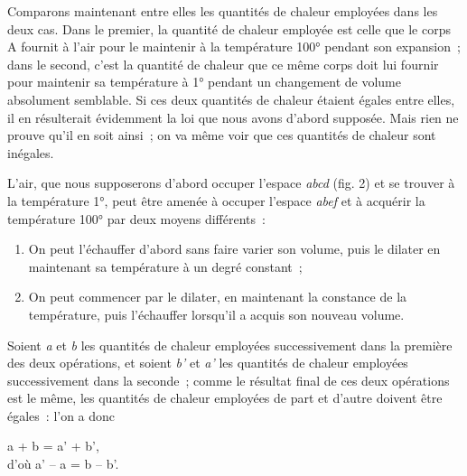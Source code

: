 \documentclass[french,twoside]{book} %
\begin{document}
Comparons maintenant entre elles les quantités de chaleur employées dans les deux cas. Dans le premier, la quantité de chaleur employée est celle que le corps A fournit à l’air pour le maintenir à la température 100° pendant son expansion ; dans le second, c’est la quantité de chaleur que ce même corps doit lui fournir pour maintenir sa température à 1° pendant un changement de volume absolument semblable. Si ces deux quantités de chaleur étaient égales entre elles, il en résulterait évidemment la loi que nous avons d’abord supposée. Mais rien ne prouve qu’il en soit ainsi ; on va même voir que ces quantités de chaleur sont inégales.\par
L’air, que nous supposerons d’abord occuper l’espace \emph{abcd} (fig. 2) et se trouver à la température 1°, peut être amenée à occuper l’espace \emph{abef} et à acquérir la température 100° par deux moyens différents :\par

\begin{enumerate}[itemsep=0pt,topsep=0pt,partopsep=0pt,parskip=0pt]
\item On peut l’échauffer d’abord sans faire varier son volume, puis le dilater en maintenant sa température à un degré constant ;
\item On peut commencer par le dilater, en maintenant la constance de la température, puis l’échauffer lorsqu’il a acquis son nouveau volume.
\end{enumerate}

\noindent Soient \emph{a} et \emph{b} les quantités de chaleur employées successivement dans la première des deux opérations, et soient \emph{b’} et \emph{a’} les quantités de chaleur employées successivement dans la seconde ; comme le résultat final de ces deux opérations est le même, les quantités de chaleur employées de part et d’autre doivent être égales : l’on a donc\par

\begin{center}
\noindent a + b = a’ + b’, \\
d’où a’ – a = b – b’.\par
\end{center}
\end{document}
